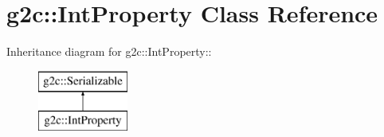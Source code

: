 \hypertarget{classg2c_1_1_int_property}{
\section{g2c::IntProperty Class Reference}
\label{classg2c_1_1_int_property}
}
Inheritance diagram for g2c::IntProperty::\begin{figure}[H]
\begin{center}
\leavevmode
\includegraphics[height=2cm]{classg2c_1_1_int_property}
\end{center}
\end{figure}

